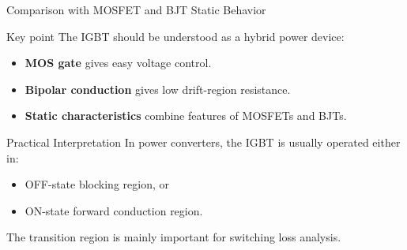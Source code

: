 \begin{frame}{Comparison with MOSFET and BJT Static Behavior}
\begin{block}{Key point}
The IGBT should be understood as a hybrid power device:
\begin{itemize}
    \item \textbf{MOS gate} gives easy voltage control.
    \item \textbf{Bipolar conduction} gives low drift-region resistance.
    \item \textbf{Static characteristics} combine features of MOSFETs and BJTs.
\end{itemize}
\end{block}

\begin{block}{Practical Interpretation}
In power converters, the IGBT is usually operated either in:
\begin{itemize}
    \item OFF-state blocking region, or
    \item ON-state forward conduction region.
\end{itemize}
The transition region is mainly important for switching loss analysis.
\end{block}
\end{frame}


